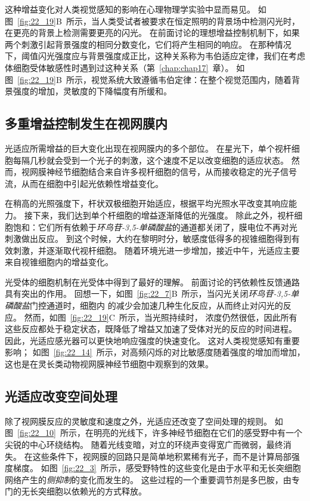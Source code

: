 这种增益变化对人类视觉感知的影响在心理物理学实验中显而易见。
如图~\ref{fig:22_19}B~所示，当人类受试者被要求在恒定照明的背景场中检测闪光时，在更亮的背景上检测需要更亮的闪光。
在前面讨论的理想增益控制机制下，如果两个刺激引起背景强度的相同分数变化，它们将产生相同的响应。
在那种情况下，阈值闪光强度应与背景强度成正比，这种关系称为韦伯适应定律，我们在考虑体细胞受体敏感性时遇到过这种关系（第~\ref{chap:chap17}~章）。
如图~\ref{fig:22_19}B~所示，视觉系统大致遵循韦伯定律：在整个视觉范围内，随着背景强度的增加，灵敏度的下降幅度有所缓和。



\subsection{多重增益控制发生在视网膜内}

光适应所需增益的巨大变化出现在视网膜内的多个部位。 
在星光下，单个视杆细胞每隔几秒就会受到一个光子的刺激，这个速度不足以改变细胞的适应状态。
然而，视网膜神经节细胞结合来自许多视杆细胞的信号，从而接收稳定的光子信号流，从而在细胞中引起光依赖性增益变化。


在稍高的光照强度下，杆状双极细胞开始适应，根据平均光照水平改变其响应能力。
接下来，我们达到单个杆细胞的增益逐渐降低的光强度。 
除此之外，视杆细胞饱和：它们所有依赖于\textit{环鸟苷-3,5-单磷酸盐}的通道都关闭了，膜电位不再对光刺激做出反应。
到这个时候，大约在黎明时分，敏感度低得多的视锥细胞得到有效刺激，并逐渐取代视杆细胞。
随着环境光进一步增加，接近中午，光适应主要来自视锥细胞内的增益变化。


光受体的细胞机制在光受体中得到了最好的理解。
前面讨论的钙依赖性反馈通路具有突出的作用。
回想一下，如图~\ref{fig:22_7}B~所示，当闪光关闭\textit{环鸟苷-3,5-单磷酸盐}门控通道时，细胞内  的减少会加速几种生化反应，从而终止对闪光的反应。
然而，如图~\ref{fig:22_19}C~所示，当光照持续时， 浓度仍然很低，因此所有这些反应都处于稳定状态，既降低了增益又加速了受体对光的反应的时间进程。
因此，光适应感光器可以更快地响应强度的快速变化。
这对人类视觉感知有重要影响；
如图~\ref{fig:22_14}~所示，对高频闪烁的对比敏感度随着强度的增加而增加，这也是在灵长类动物视网膜神经节细胞中观察到的效果。



\subsection{光适应改变空间处理}

除了视网膜反应的灵敏度和速度之外，光适应还改变了空间处理的规则。
如图~\ref{fig:22_10}~所示，在明亮的光线下，许多神经节细胞在它们的感受野中有一个尖锐的中心环绕结构。 
随着光线变暗，对立的环绕声变得宽广而微弱，最终消失。
在这些条件下，视网膜的回路只是简单地积累稀有光子，而不是计算局部强度梯度。
如图~\ref{fig:22_3}~所示，感受野特性的这些变化是由于水平和无长突细胞网络产生的\textit{侧抑制}的变化而发生的。
这些过程的一个重要调节剂是多巴胺，由专门的无长突细胞以依赖光的方式释放。


